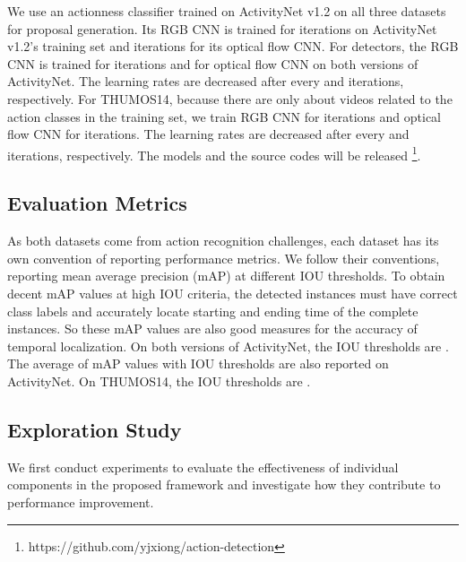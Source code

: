 \documentclass[10pt,twocolumn,letterpaper]{article}
\begin{document}
We use an actionness classifier trained on ActivityNet v1.2 on all three datasets for proposal generation. Its RGB CNN is trained for  iterations on ActivityNet v1.2's training set and  iterations for its optical flow CNN.
For detectors, the RGB CNN is trained for  iterations and  for optical flow CNN on both versions of ActivityNet.
The learning rates are decreased after every  and  iterations, respectively.
For THUMOS14, because there are only about  videos related to the  action classes in the training set, 
we train RGB CNN for  iterations and optical flow CNN for  iterations. 
The learning rates are decreased after every  and  iterations, respectively.
The models and the source codes will be released
\footnote{https://github.com/yjxiong/action-detection}.


\subsection{Evaluation Metrics}\label{sec:exp/metrics}

As both datasets come from action recognition challenges, 
each dataset has its own convention of reporting performance metrics.
We follow their conventions, reporting mean average precision (mAP) at different IOU thresholds.
To obtain decent mAP values at high IOU criteria, the detected instances must have correct class labels and accurately locate starting and ending time of the complete instances. 
So these mAP values are also good measures for the accuracy of temporal localization.
On both versions of ActivityNet, the IOU thresholds are . 
The average of mAP values with IOU thresholds  are also reported on ActivityNet.
On THUMOS14, the IOU thresholds are .



\subsection{Exploration Study}

We first conduct experiments to evaluate the effectiveness of individual components in the proposed framework and investigate how they contribute to 
performance improvement.
\end{document}
